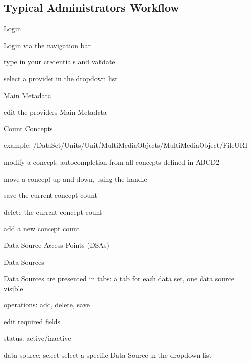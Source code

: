\subsection*{Typical Administrator\textquotesingle{}s Workflow}


\begin{DoxyEnumerate}
\item Login
\begin{DoxyItemize}
\item Login via the navigation bar
\item type in your credentials and validate
\item select a provider in the dropdown list
\end{DoxyItemize}
\item Main Metadata
\begin{DoxyItemize}
\item edit the provider\textquotesingle{}s Main Metadata
\end{DoxyItemize}
\item Count Concepts
\begin{DoxyItemize}
\item example\+: {\ttfamily /\+Data\+Set/\+Units/\+Unit/\+Multi\+Media\+Objects/\+Multi\+Media\+Object/\+File\+U\+RI}
\item modify a concept\+: autocompletion from all concepts defined in A\+B\+C\+D2
\item move a concept up and down, using the handle
\item save the current concept count
\item delete the current concept count
\item add a new concept count
\end{DoxyItemize}
\item Data Source Access Points (D\+S\+As)
\begin{DoxyItemize}
\item Data Sources
\begin{DoxyItemize}
\item Data Sources are presented in tabs\+: a tab for each data set, one data source visible
\item operations\+: {\ttfamily add}, {\ttfamily delete}, {\ttfamily save}
\item edit required fields
\begin{DoxyItemize}
\item status\+: active/inactive
\end{DoxyItemize}
\item data-\/source\+: select select a specific Data Source in the dropdown list

\end{DoxyItemize}
\end{DoxyItemize}
\end{DoxyEnumerate}
